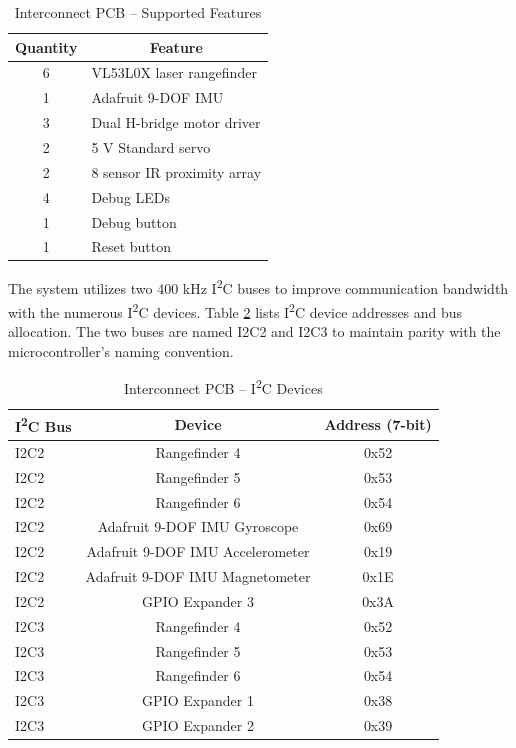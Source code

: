 \begin{table}[h]
	\centering	\caption{Interconnect PCB -- Supported Features}
	\begin{tabular}{cl}
		\hline 
		Quantity & \multicolumn{1}{c}{Feature} \\ \hline 
		6 & VL53L0X laser rangefinder \\ \hline 
		1 & Adafruit 9-DOF IMU \\ \hline
		3 & Dual H-bridge motor driver \\ \hline
		2 & 5 V Standard servo \\ \hline
		2 & 8 sensor IR proximity array \\ \hline
		4 & Debug LEDs \\ \hline
		1 & Debug button \\ \hline
		1 & Reset button \\ \hline
	\end{tabular} 
	\label{tab:interconnect_features}
\end{table}

The system utilizes two 400 kHz I\textsuperscript{2}C buses to improve communication bandwidth with the numerous I\textsuperscript{2}C devices. Table \ref{tab:i2c_table} lists I\textsuperscript{2}C device addresses and bus allocation. The two buses are named I2C2 and I2C3 to maintain parity with the microcontroller's naming convention.

\begin{table}[h]
	\centering	\caption{Interconnect PCB -- I\textsuperscript{2}C Devices}
	\begin{tabular}{lcc}
		\hline 
		\multicolumn{1}{c}{I\textsuperscript{2}C Bus} & Device & Address (7-bit) \\ \hline 
		I2C2 & Rangefinder 4 & 0x52 \\ \hline 
		I2C2 & Rangefinder 5 & 0x53 \\ \hline 
		I2C2 & Rangefinder 6 & 0x54 \\ \hline 
		I2C2 & Adafruit 9-DOF IMU Gyroscope & 0x69 \\ \hline
		I2C2 & Adafruit 9-DOF IMU Accelerometer & 0x19\\ \hline		
		I2C2 & Adafruit 9-DOF IMU Magnetometer & 0x1E \\ \hline		
		I2C2 & GPIO Expander 3 & 0x3A \\ \hline				
		I2C3 & Rangefinder 4 & 0x52 \\ \hline 
		I2C3 & Rangefinder 5 & 0x53 \\ \hline 
		I2C3 & Rangefinder 6 & 0x54 \\ \hline 
		I2C3 & GPIO Expander 1 & 0x38 \\ \hline				
		I2C3 & GPIO Expander 2 & 0x39 \\ \hline				
	\end{tabular} 
	\label{tab:i2c_table}
\end{table}

